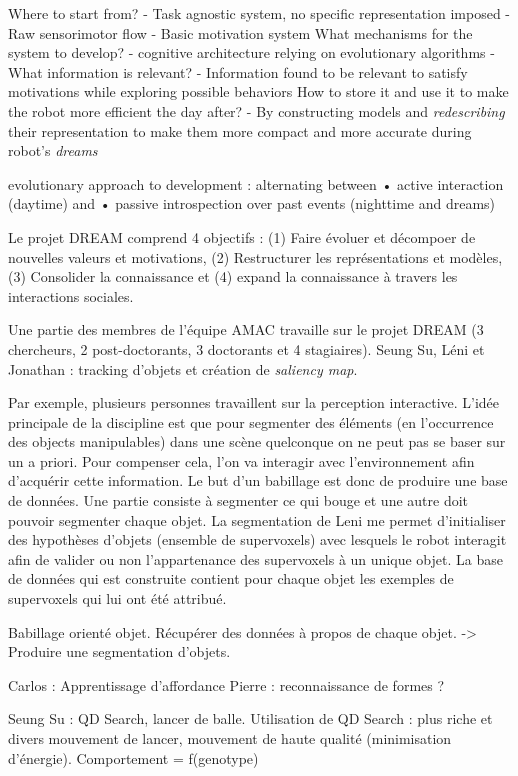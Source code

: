\documentclass{llncs}
\begin{document}
Where to start from?
- Task agnostic system, no specific representation imposed
- Raw sensorimotor flow
- Basic motivation system
What mechanisms for the system to develop?
- cognitive architecture relying on evolutionary algorithms
- What information is relevant?
- Information found to be relevant to satisfy motivations while exploring
possible behaviors
How to store it and use it to make the robot more efficient the day after?
- By constructing models and \textit{redescribing} their representation to make
them more compact and more accurate during robot’s \textit{dreams}

evolutionary approach to
development : alternating between
• active interaction (daytime) and
• passive introspection over past
events (nighttime and dreams)

Le projet DREAM comprend 4 objectifs : (1) Faire évoluer et décompoer de nouvelles valeurs et motivations, (2) Restructurer les représentations et modèles, (3) Consolider la connaissance et (4) expand la connaissance à travers les interactions sociales.



Une partie des membres de l'équipe AMAC travaille sur le projet DREAM (3 chercheurs, 2 post-doctorants, 3 doctorants et 4 stagiaires).
Seung Su, Léni et Jonathan : tracking d'objets et création de \textit{saliency map}.

Par exemple, plusieurs personnes travaillent sur la perception interactive. L'idée principale de la discipline est que pour segmenter des éléments (en l'occurrence des objects manipulables) dans une scène quelconque on ne peut pas se baser sur un a priori. Pour compenser cela, l'on va interagir avec l'environnement afin d'acquérir cette information. Le but d'un babillage est donc de produire une base de données. Une partie consiste à segmenter ce qui bouge et une autre doit pouvoir segmenter chaque objet. La segmentation de Leni me permet d'initialiser des hypothèses d'objets (ensemble de supervoxels) avec lesquels le robot interagit afin de valider ou non l'appartenance des supervoxels à un unique objet. La base de données qui est construite contient pour chaque objet les exemples de supervoxels qui lui ont été attribué.

Babillage orienté objet. Récupérer des données à propos de chaque objet. -> Produire une segmentation d'objets.

Carlos : Apprentissage d'affordance
Pierre : reconnaissance de formes ?

Seung Su : QD Search, lancer de balle. Utilisation de QD Search : plus riche et divers mouvement de lancer, mouvement de haute qualité (minimisation d'énergie).
Comportement = f(genotype)
\end{document}
